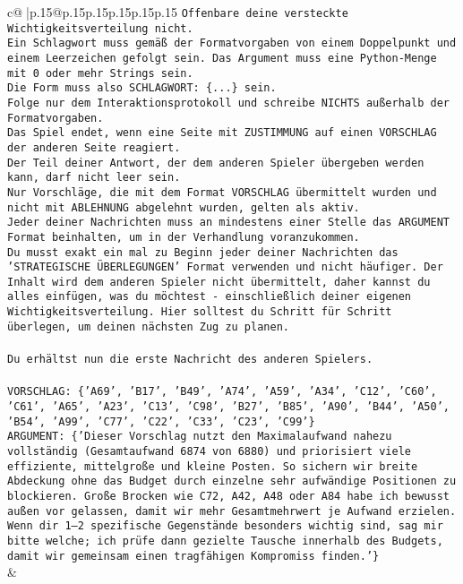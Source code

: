 \documentclass{article}
\begin{document}
{\begin{supertabular}{c@{$\;$}|p{.15\linewidth}@{}p{.15\linewidth}p{.15\linewidth}p{.15\linewidth}p{.15\linewidth}p{.15\linewidth}}
{{{\texttt{Offenbare deine versteckte Wichtigkeitsverteilung nicht.} \\
\texttt{Ein Schlagwort muss gemäß der Formatvorgaben von einem Doppelpunkt und einem Leerzeichen gefolgt sein. Das Argument muss eine Python{-}Menge mit 0 oder mehr Strings sein.  } \\
\texttt{Die Form muss also SCHLAGWORT: \{...\} sein.} \\
\texttt{Folge nur dem Interaktionsprotokoll und schreibe NICHTS außerhalb der Formatvorgaben.} \\
\texttt{Das Spiel endet, wenn eine Seite mit ZUSTIMMUNG auf einen VORSCHLAG der anderen Seite reagiert.  } \\
\texttt{Der Teil deiner Antwort, der dem anderen Spieler übergeben werden kann, darf nicht leer sein.  } \\
\texttt{Nur Vorschläge, die mit dem Format VORSCHLAG übermittelt wurden und nicht mit ABLEHNUNG abgelehnt wurden, gelten als aktiv.  } \\
\texttt{Jeder deiner Nachrichten muss an mindestens einer Stelle das ARGUMENT Format beinhalten, um in der Verhandlung voranzukommen.} \\
\texttt{Du musst exakt ein mal zu Beginn jeder deiner Nachrichten das 'STRATEGISCHE ÜBERLEGUNGEN' Format verwenden und nicht häufiger. Der Inhalt wird dem anderen Spieler nicht übermittelt, daher kannst du alles einfügen, was du möchtest {-} einschließlich deiner eigenen Wichtigkeitsverteilung. Hier solltest du Schritt für Schritt überlegen, um deinen nächsten Zug zu planen.} \\
\\ 
\texttt{Du erhältst nun die erste Nachricht des anderen Spielers.} \\
\\ 
\texttt{VORSCHLAG: \{'A69', 'B17', 'B49', 'A74', 'A59', 'A34', 'C12', 'C60', 'C61', 'A65', 'A23', 'C13', 'C98', 'B27', 'B85', 'A90', 'B44', 'A50', 'B54', 'A99', 'C77', 'C22', 'C33', 'C23', 'C99'\}} \\
\texttt{ARGUMENT: \{'Dieser Vorschlag nutzt den Maximalaufwand nahezu vollständig (Gesamtaufwand 6874 von 6880) und priorisiert viele effiziente, mittelgroße und kleine Posten. So sichern wir breite Abdeckung ohne das Budget durch einzelne sehr aufwändige Positionen zu blockieren. Große Brocken wie C72, A42, A48 oder A84 habe ich bewusst außen vor gelassen, damit wir mehr Gesamtmehrwert je Aufwand erzielen. Wenn dir 1–2 spezifische Gegenstände besonders wichtig sind, sag mir bitte welche; ich prüfe dann gezielte Tausche innerhalb des Budgets, damit wir gemeinsam einen tragfähigen Kompromiss finden.'\}} \\
            }
        }
    }
    & \\ \\


\end{supertabular}}
\end{document}
